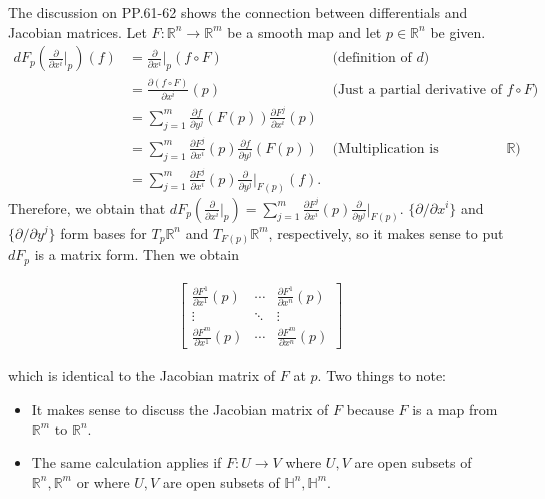 \begin{rem}
  The discussion on PP.61-62 shows the connection between differentials and Jacobian matrices.
  Let $F: \mathbb{R}^n \rightarrow \mathbb{R}^m$ be a smooth map and let $p \in \mathbb{R}^n$ be given.
  \begin{align}
    dF_p(\frac{\partial}{\partial x^i}\Big\vert_p)(f) 
      &= \frac{\partial}{\partial x^i}\Big\vert_p(f \circ F) & \text{(definition of $d$)} \\
      &= \frac{\partial (f \circ F)}{\partial x^i}(p) & \text{(Just a partial derivative of $f \circ F$)} \\
      &= \sum_{j=1}^{m} \frac{\partial f}{\partial y^j}(F(p))\frac{\partial F^j}{\partial x^i}(p) \\
      &= \sum_{j=1}^{m} \frac{\partial F^j}{\partial x^i}(p)\frac{\partial f}{\partial y^j}(F(p)) & \text{(Multiplication is commutative in $\mathbb{R}$)} \\
      &= \sum_{j=1}^{m} \frac{\partial F^j}{\partial x^i}(p)\frac{\partial}{\partial y^j}\Big\vert_{F(p)}(f).
  \end{align}
  Therefore, we obtain that $dF_p(\frac{\partial}{\partial x^i}\big\vert_p) = \sum_{j=1}^{m} \frac{\partial F^j}{\partial x^i}(p)\frac{\partial}{\partial y^j}\big\vert_{F(p)}$.
  $\{ \partial / \partial x^i \}$ and $\{ \partial / \partial y^j \}$ form bases for $T_p\mathbb{R}^n$ and $T_{F(p)}\mathbb{R}^m$, respectively, so it makes sense to put $dF_p$ is a matrix form.
  Then we obtain

  \begin{align*}
    \begin{bmatrix}
      \frac{\partial F^1}{\partial x^1}(p) & \cdots & \frac{\partial F^1}{\partial x^n}(p) \\
      \vdots & \ddots & \vdots \\
      \frac{\partial F^m}{\partial x^1}(p) & \cdots & \frac{\partial F^m}{\partial x^n}(p)
    \end{bmatrix}
  \end{align*}

  which is identical to the Jacobian matrix of $F$ at $p$.
  Two things to note:
  \begin{itemize}
    \item
      It makes sense to discuss the Jacobian matrix of $F$ because $F$ is a map from $\mathbb{R}^m$ to $\mathbb{R}^n$.
    \item
      The same calculation applies if $F: U \rightarrow V$ where $U, V$ are open subsets of $\mathbb{R}^n, \mathbb{R}^m$ or where $U, V$ are open subsets of $\mathbb{H}^n, \mathbb{H}^m$.
  \end{itemize}


\end{rem}

